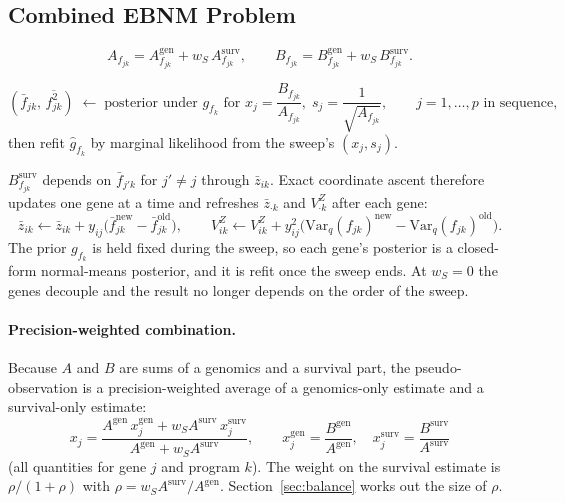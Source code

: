 \documentclass[11pt]{article}
\newcommand{\fbar}[2]{\bar{f}_{#1#2}}
\newcommand{\zbar}[2]{\bar{z}_{#1#2}}
\newcommand{\fsec}[2]{\overline{f^2_{#1#2}}}
\newcommand{\Var}{\mathrm{Var}_q}
\newcommand{\ws}{w_S}
\begin{document}
\subsection{Combined EBNM Problem}

\begin{equation}\label{eq:AB-F}
  A_{f_{jk}} = A^{\text{gen}}_{f_{jk}} + \ws\,A^{\text{surv}}_{f_{jk}}, \qquad
  B_{f_{jk}} = B^{\text{gen}}_{f_{jk}} + \ws\,B^{\text{surv}}_{f_{jk}}.
\end{equation}

\begin{ebnmbox}
\[
  (\fbar{j}{k},\,\fsec{j}{k}) \;\leftarrow\;
  \text{posterior under } g_{f_k}\text{ for }
  x_j = \frac{B_{f_{jk}}}{A_{f_{jk}}},\; s_j = \frac{1}{\sqrt{A_{f_{jk}}}},
  \qquad j = 1,\ldots,p \text{ in sequence},
\]
then refit $\hat g_{f_k}$ by marginal likelihood from the sweep's $(x_j, s_j)$.
\end{ebnmbox}

\begin{keybox}
$B^{\text{surv}}_{f_{jk}}$ depends on $\fbar{j'}{k}$ for $j'\ne j$ through
$\zbar{i}{k}$. Exact coordinate ascent therefore updates one gene at a time and
refreshes $\zbar{\cdot}{k}$ and $V^Z_{\cdot k}$ after each gene:
\[
  \zbar{i}{k} \leftarrow \zbar{i}{k} + y_{ij}\bigl(\fbar{j}{k}^{\text{new}} - \fbar{j}{k}^{\text{old}}\bigr),
  \qquad
  V^Z_{ik} \leftarrow V^Z_{ik} + y_{ij}^2\bigl(\Var(f_{jk})^{\text{new}} - \Var(f_{jk})^{\text{old}}\bigr).
\]
The prior $g_{f_k}$ is held fixed during the sweep, so each gene's posterior is a
closed-form normal-means posterior, and it is refit once the sweep ends. At
$\ws = 0$ the genes decouple and the result no longer depends on the order of
the sweep.
\end{keybox}

\paragraph{Precision-weighted combination.} Because $A$ and $B$ are sums of a
genomics and a survival part, the pseudo-observation is a precision-weighted
average of a genomics-only estimate and a survival-only estimate:
\begin{equation}\label{eq:F-combination}
  x_j = \frac{A^{\text{gen}}\,x^{\text{gen}}_j + \ws A^{\text{surv}}\,x^{\text{surv}}_j}
             {A^{\text{gen}} + \ws A^{\text{surv}}},
  \qquad
  x^{\text{gen}}_j = \frac{B^{\text{gen}}}{A^{\text{gen}}},\quad
  x^{\text{surv}}_j = \frac{B^{\text{surv}}}{A^{\text{surv}}}
\end{equation}
(all quantities for gene $j$ and program $k$). The weight on the survival
estimate is $\rho/(1+\rho)$ with $\rho = \ws A^{\text{surv}}/A^{\text{gen}}$.
Section~\ref{sec:balance} works out the size of $\rho$.
\end{document}
